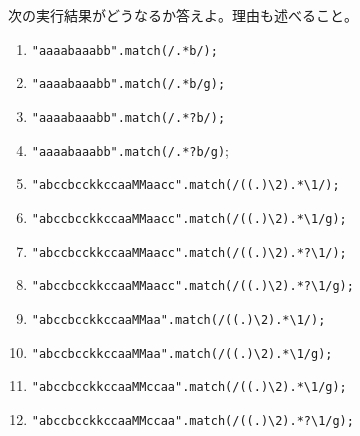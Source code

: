 
\newcommand{\makeVSPACE}{%
  \ifText\vspace{0.03\textheight}\fi}
\begin{Prob}\upshape\Must
次の実行結果がどうなるか答えよ。理由も述べること。
\begin{enumerate}
 \item \texttt{"aaaabaaabb".match(/.*b/);}\makeVSPACE
 \item \texttt{"aaaabaaabb".match(/.*b/g);}\makeVSPACE
 \item \texttt{"aaaabaaabb".match(/.*?b/);}\makeVSPACE
 \item \texttt{"aaaabaaabb".match(/.*?b/g)};\makeVSPACE
 \item \Verb+"abccbcckkccaaMMaacc".match(/((.)\2).*\1/);+\makeVSPACE
 \item \Verb+"abccbcckkccaaMMaacc".match(/((.)\2).*\1/g);+\makeVSPACE
 \item \Verb+"abccbcckkccaaMMaacc".match(/((.)\2).*?\1/);+\makeVSPACE
 \item \Verb+"abccbcckkccaaMMaacc".match(/((.)\2).*?\1/g);+\makeVSPACE
 \item \Verb+"abccbcckkccaaMMaa".match(/((.)\2).*\1/);+\makeVSPACE
 \item \Verb+"abccbcckkccaaMMaa".match(/((.)\2).*\1/g);+\makeVSPACE
 \item \Verb+"abccbcckkccaaMMccaa".match(/((.)\2).*\1/g);+\makeVSPACE
 \item \Verb+"abccbcckkccaaMMccaa".match(/((.)\2).*?\1/g);+\makeVSPACE
%
\end{enumerate}
  \end{Prob}
\iffalse
"abccbcckkccaaMMaacc".match(/((.)\2).*\1/g);
["ccbcckkccaaMMaacc"]
"abccbcckkccaaMMaacc".match(/((.)\2).*?\1/g);
["ccbcc", "ccaaMMaacc"]
"abccbcckkccaaMMccaa".match(/((.)\2).*\1/g);
["ccbcckkccaaMMcc"]
"abccbcckkccaaMMccaa".match(/((.)\2).*?\1/g);
["ccbcc", "ccaaMMcc"]
\fi